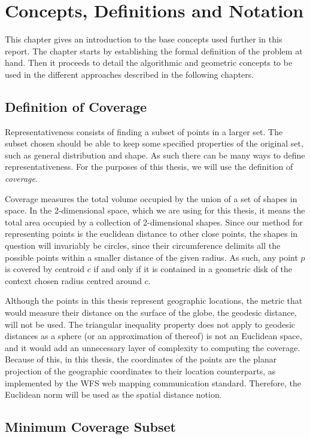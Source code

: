\chapter{Concepts, Definitions and Notation}
\label{chap:theory}
This chapter gives an introduction to the base concepts used further in this report.
The chapter starts by establishing the formal definition of the problem at hand. 
Then it proceeds to detail the algorithmic and geometric concepts to be used in the different approaches described in the following chapters.
\section{Definition of Coverage}
\label{sect:problem}
Representativeness consists of finding a subset of points in a larger set. The subset chosen should be able to keep some specified properties of the original set, such as general distribution and shape. As such there can be many ways to define representativeness. For the purposes of this thesis, we will use the definition of \emph{coverage}.

Coverage measures the total volume occupied by the union of a set of shapes in space. In the 2-dimensional space, which we are using for this thesis, it means the total area occupied by a collection of 2-dimensional shapes. Since our method for representing points is the euclidean distance to other close points, the shapes in question will invariably be circles, since their circumference delimits all the possible points within a smaller distance of the given radius. As such, any point $p$ is covered by centroid $c$ if and only if it is contained in a geometric disk of the context chosen radius centred around $c$.

Although the points in this thesis represent geographic locations, the metric that would measure their distance on the surface of the globe, the geodesic distance, will not be used. The triangular inequality property does not apply to geodesic distances as a sphere (or an approximation of thereof) is not an Euclidean space, and it would add an unnecessary layer of complexity to computing the coverage.
Because of this, in this thesis, the coordinates of the points are the planar projection of the geographic coordinates to their location counterparts, as implemented by the WFS web mapping communication standard. Therefore, the Euclidean norm will be used as the spatial distance notion.

\section{Minimum Coverage Subset}

